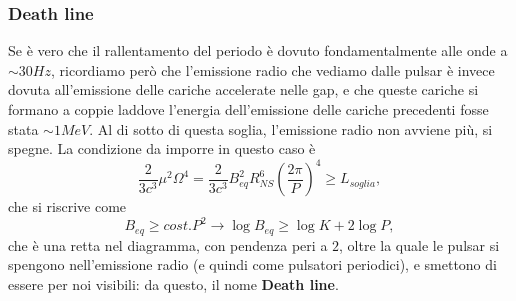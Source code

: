 \subsubsection{Death line}
Se è vero che il rallentamento del periodo è dovuto fondamentalmente alle onde a $\sim30Hz$, ricordiamo però che l'emissione radio che vediamo dalle pulsar è invece dovuta all'emissione delle cariche accelerate nelle gap, e che queste cariche si formano a coppie laddove l'energia dell'emissione delle cariche precedenti fosse stata $\sim 1MeV$.
Al di sotto di questa soglia, l'emissione radio non avviene più, si spegne.
La condizione da imporre in questo caso è
\begin{equation}
    \frac{2}{3c^3}\mu^2\Omega^4 = \frac{2}{3c^3}B_{eq}^2R_{NS}^6\left(\frac{2\pi}{P}\right)^4\geq L_{soglia},
\end{equation}
che si riscrive come
\begin{equation}
    B_{eq}\geq cost.P^2 \xrightarrow{} \log B_{eq} \geq \log K+ 2\log P,
\end{equation}
che è una retta nel diagramma, con pendenza peri a $2$, oltre la quale le pulsar si spengono nell'emissione radio (e quindi come pulsatori periodici), e smettono di essere per noi visibili: da questo, il nome \textbf{Death line}.

